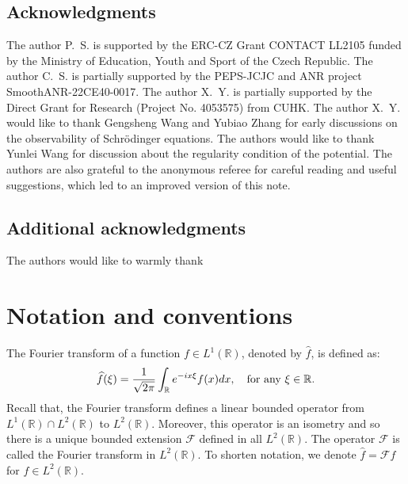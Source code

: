 \documentclass[a4paper,reqno]{amsart}
\theoremstyle{definition}
\numberwithin{equation}{section}
\newcommand{\R}{\mathbb{R}}
\def \R {{\mathbb{R} }}
\def \d {{\rm{d}}}
\begin{document}
\subsection*{Acknowledgments}
The author P.~S. is supported by the ERC-CZ Grant CONTACT LL2105 funded by the Ministry of Education, Youth and Sport of the Czech Republic.
The author C.~S. is partially supported by the PEPS-JCJC and ANR project SmoothANR-22CE40-0017. The author X.~Y. is partially supported by the Direct Grant for Research (Project No. 4053575) from CUHK.
The author X.~Y. would like to thank Gengsheng Wang and Yubiao Zhang for early discussions on the observability of Schr\"odinger equations. The authors would like to thank Yunlei Wang for discussion about the regularity condition of the potential. The authors are also grateful to the anonymous referee for careful reading and useful suggestions, which led to an improved version of this note.


\subsection*{Additional acknowledgments}
The authors would like to warmly thank 


\section{Notation and conventions}\label{SS:Nota}
The Fourier transform of a function $f\in L^{1}(\R)$, denoted by $\widehat{f}$, is defined as:
\begin{equation*}
    \widehat{f}(\xi)=\frac{1}{\sqrt{2\pi}}\int_{\R}e^{- i x\xi}f(x)\d x,\quad \mbox{for any}\ \xi\in \R.
\end{equation*}
Recall that, the Fourier transform defines a linear bounded operator from $L^{1}(\R)\cap L^{2}(\R)$ to $L^{2}(\R)$. Moreover,  this operator is an isometry and so  there is a unique bounded extension $\mathcal{F}$ defined in all $L^{2}(\R)$. The operator $\mathcal{F}$ is called the Fourier transform in $L^{2}(\R)$.
To shorten notation, we denote $\widehat{f}=\mathcal{F}f$ for $f\in L^{2}(\R)$.
\end{document}
